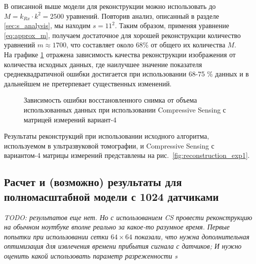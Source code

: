 \documentclass[14pt]{matmex-diploma}
\begin{document}
В описанной выше модели для реконструкции можно использовать до $M = k_{Rx} \cdot k^2 = 2500$ уравнений. Повторив анализ, описанный в разделе \ref{sec:s_analysis}, мы находим $s=11^2$. 
Таким образом, применяя уравнение \eqref{eq:approx_m}, получаем достаточное для хорошей реконструкции количество уравнений $m \approx 1700$, что составляет около 68\% от общего их количества $M$. \\
На графике \ref{fig:used_equations} отражена зависимость качества реконструкции изображения от количества исходных данных, где наилучшее значение показателя среднеквадратичной ошибки  достигается при использовании 68-75 \% данных и в дальнейшем не претерпевает существенных изменений.

\begin{figure}[h]
\centering
    \caption{Зависимость ошибки восстановленного снимка от объема использованных данных при использовании Compressive Sensing с матрицей измерений вариант-4}
    \label{fig:used_equations}
\end{figure}

Результаты реконструкций при использовании исходного алгоритма, используемом в ультразвуковой томографии, и Compressive Sensing с вариантом-4 матрицы измерений представлены на рис.~\ref{fig:reconstruction_exp1}.




\subsection{Расчет и (возможно) результаты для полномасштабной модели с 1024 датчиками}
\textit{TODO: результатов еще нет. Но с использованием CS провести реконструкцию на обычном ноутбуке вполне реально за какое-то разумное время. Первые попытки при использовании сетки $64\times 64$ показали, что нужна дополнительная оптимизация для извлечения времени прибытия сигнала с датчиков; И нужно оценить какой использовать параметр разреженности s}\\
\end{document}

